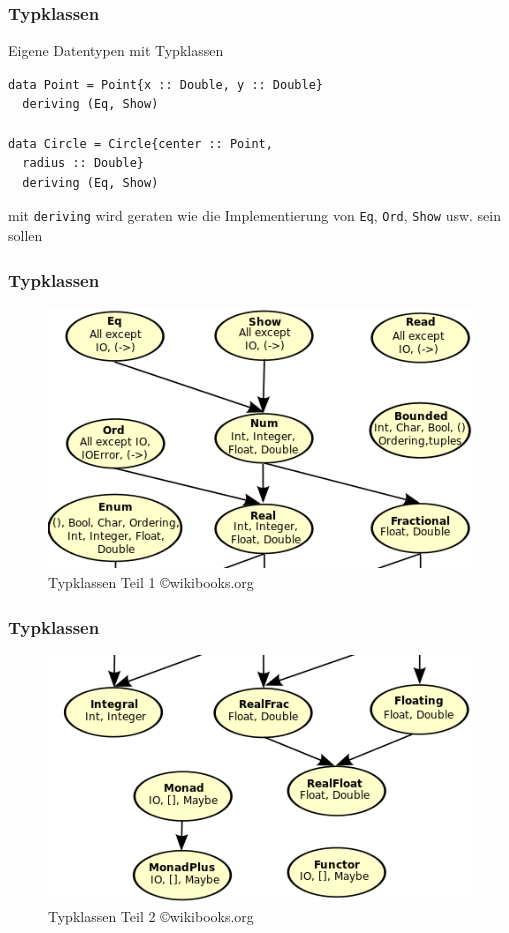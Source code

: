 \begin{frame}[fragile]
\frametitle{Typklassen}
\begin{block}{Eigene Datentypen mit Typklassen}
\begin{lstlisting}
data Point = Point{x :: Double, y :: Double}
  deriving (Eq, Show)

data Circle = Circle{center :: Point, 
  radius :: Double}
  deriving (Eq, Show)
\end{lstlisting}
mit \lstinline|deriving| wird geraten wie die Implementierung von \lstinline|Eq|, \lstinline|Ord|, \lstinline|Show| usw. sein sollen
\end{block}
\end{frame}

\begin{frame}[fragile]
\frametitle{Typklassen}
\begin{figure}
\includegraphics[scale=0.75]{images/Classes1.png}
\caption{Typklassen Teil 1 \copyright wikibooks.org}
\end{figure}
\end{frame}

\begin{frame}[fragile]
\frametitle{Typklassen}
\begin{figure}
\includegraphics[scale=0.75]{images/Classes2.png}
\caption{Typklassen Teil 2 \copyright wikibooks.org}
\end{figure}
\end{frame}

